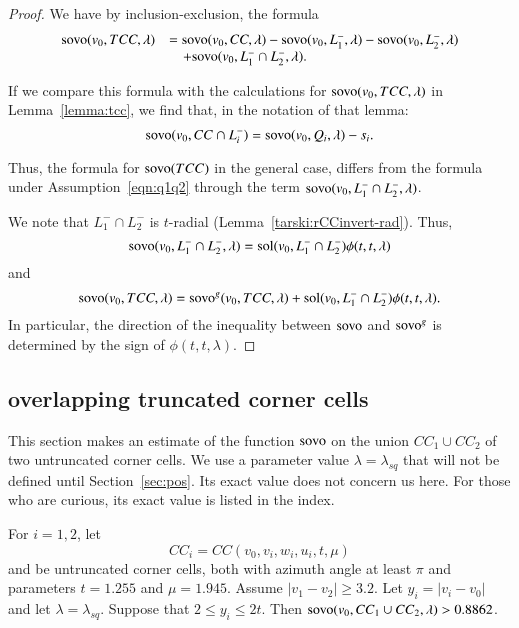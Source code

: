 \begin{proof}
We have by inclusion-exclusion, the formula
$$
\begin{array}{lll}
{\operatorname{sovo}}(v_0,TCC,\lambda) &=
{\operatorname{sovo}}(v_0,CC,\lambda) -
{\operatorname{sovo}}(v_0, L_1^-,\lambda) -
{\operatorname{sovo}}(v_0, L_2^-,\lambda) \\
 &\quad +
{\operatorname{sovo}}(v_0, L_1^- \cap L_2^-,\lambda).
\end{array}
$$

If we compare this formula with the calculations for 
${\operatorname{sovo}}(v_0,TCC,\lambda)$ in Lemma~\ref{lemma:tcc}, 
we find that, in the notation of that lemma:
$$
{\operatorname{sovo}}(v_0,CC\cap L_i^-) = {\operatorname{sovo}}(v_0,Q_i,\lambda) - s_i.
$$

Thus, the formula for ${\operatorname{sovo}}(TCC)$ in the general case,
differs from the formula under Assumption~\ref{eqn:q1q2} through
the term ${\operatorname{sovo}}(v_0,L_1^-\cap L_2^-,\lambda)$.

We note that $L_1^-\cap L_2^-$ is $t$-radial 
(Lemma~\ref{tarski:rCCinvert-rad}).  Thus,
$$
{\operatorname{sovo}}(v_0,L_1^-\cap L_2^-,\lambda) =
\operatorname{sol}(v_0, L_1^-\cap L_2^-)\phi(t,t,\lambda)
$$
and
$$
{\operatorname{sovo}}(v_0,TCC,\lambda) = {\operatorname{sovo}}^g(v_0,TCC,\lambda) +
   \operatorname{sol}(v_0,L_1^-\cap L_2^-) \phi(t,t,\lambda).
$$
In particular, the direction of the inequality between
${\operatorname{sovo}}$ and ${\operatorname{sovo}}^g$ is determined by the sign
of $\phi(t,t,\lambda)$.
\end{proof}



\subsection{overlapping truncated corner cells}



This section makes an estimate of the function ${\operatorname{sovo}}$
on the union $CC_1\cup CC_2$ of two untruncated corner cells.
We use a parameter value $\lambda=\lambda_{sq}$ that will
not be defined until Section~\ref{sec:pos}.  Its exact value
does not concern us here.    For those who are curious, its
exact value is listed in the index.

\begin{lemma} 
For $i=1,2$, let $$CC_i =CC(v_0,v_i,w_i,u_i,t,\mu)$$ and 
be untruncated corner cells, both
with azimuth angle at least $\pi$ and parameters $t=1.255$ and 
$\mu=1.945$.
Assume $|v_1-v_2|\ge 3.2$.  Let $y_i =|v_i-v_0|$ and
let $\lambda = \lambda_{sq}$.
Suppose that
$2\le y_i\le 2t$.  Then
${\operatorname{sovo}}(v_0,CC_1\cup CC_2,\lambda) > 0.8862$.
\end{lemma}

